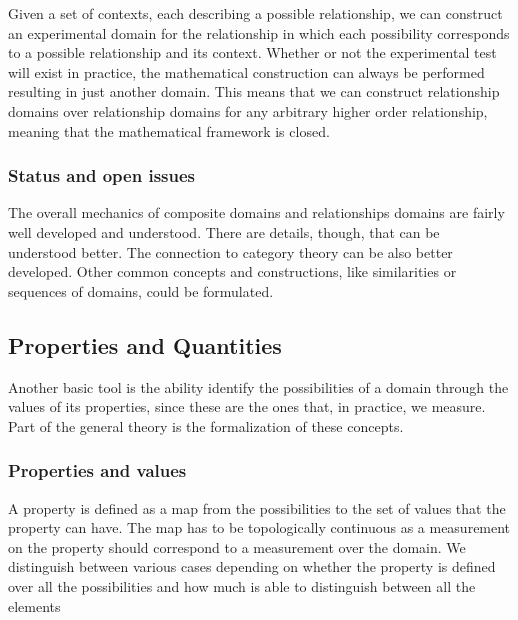 \documentclass[twocolumn]{article}
\newif\ifextended
\newcommand\fact[2]{\ifextended \emph{#1}.#2 \fi}
\begin{document}
Given a set of contexts, each describing a possible relationship, we can construct an experimental domain for the relationship in which each possibility corresponds to a possible relationship and its context. Whether or not the experimental test will exist in practice, the mathematical construction can always be performed resulting in just another domain. This means that we can construct relationship domains over relationship domains for any arbitrary higher order relationship, meaning that the mathematical framework is closed.

\fact{Tests for the relationship domain} {The experimental verifiability of relationship domain statements cannot be proven from the verifiability of each domain. This formalizes the problem that being able to measure a single point (i.e. the temperature and height in a particular circumstance) is not enough to verify the relationship (i.e. the temperature and height are always linked in a particular way). The ability to experimentally explore the space is what builds confidence, which may not be always possible. What constitutes enough evidence is left, as before, outside of the formalism.}


\subsubsection{Status and open issues}

The overall mechanics of composite domains and relationships domains are fairly well developed and understood. There are details, though, that can be understood better. The connection to category theory can be also better developed. Other common concepts and constructions, like similarities or sequences of domains, could be formulated.

\subsection{Properties and Quantities}

Another basic tool is the ability identify the possibilities of a domain through the values of its properties, since these are the ones that, in practice, we measure. Part of the general theory is the formalization of these concepts.

\subsubsection{Properties and values}

A property is defined as a map from the possibilities to the set of values that the property can have. The map has to be topologically continuous as a measurement on the property should correspond to a measurement over the domain. We distinguish between various cases depending on whether the property is defined over all the possibilities and how much is able to distinguish between all the elements
\end{document}
